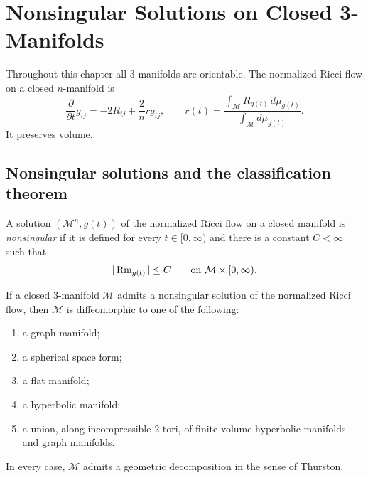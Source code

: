 \chapter{Nonsingular Solutions on Closed 3-Manifolds}
\label{ch:chow-iv-nonsingular-solutions-closed-three-manifolds}

Throughout this chapter all $3$-manifolds are orientable.  The normalized
Ricci flow on a closed $n$-manifold is
\begin{equation*}
 \frac{\partial}{\partial t}g_{ij}
 =-2R_{ij}+\frac{2}{n}r g_{ij},
 \qquad
 r(t)=\frac{\int_{\mathcal M}R_{g(t)}\,d\mu_{g(t)}}
 {\int_{\mathcal M}d\mu_{g(t)}}.
 \tag{32.1}
\end{equation*}
It preserves volume.

\section{Nonsingular solutions and the classification theorem}

\begin{definition}
\label{def:chow-iv-nonsingular-solution}
A solution $(\mathcal M^n,g(t))$ of the normalized Ricci flow on a closed
manifold is \emph{nonsingular} if it is defined for every
$t\in[0,\infty)$ and there is a constant $C<\infty$ such that
\[
 |\Rm_{g(t)}|\le C
 \qquad\text{on }\mathcal M\times[0,\infty).
\]
\end{definition}

\begin{theorem}
\label{thm:chow-iv-nonsingular-geometric-decomposition}
If a closed $3$-manifold $\mathcal M$ admits a nonsingular solution of the
normalized Ricci flow, then $\mathcal M$ is diffeomorphic to one of the
following:
\begin{enumerate}
\item a graph manifold;
\item a spherical space form;
\item a flat manifold;
\item a hyperbolic manifold;
\item a union, along incompressible $2$-tori, of finite-volume hyperbolic
manifolds and graph manifolds.
\end{enumerate}
In every case, $\mathcal M$ admits a geometric decomposition in the sense of
Thurston.
\end{theorem}

